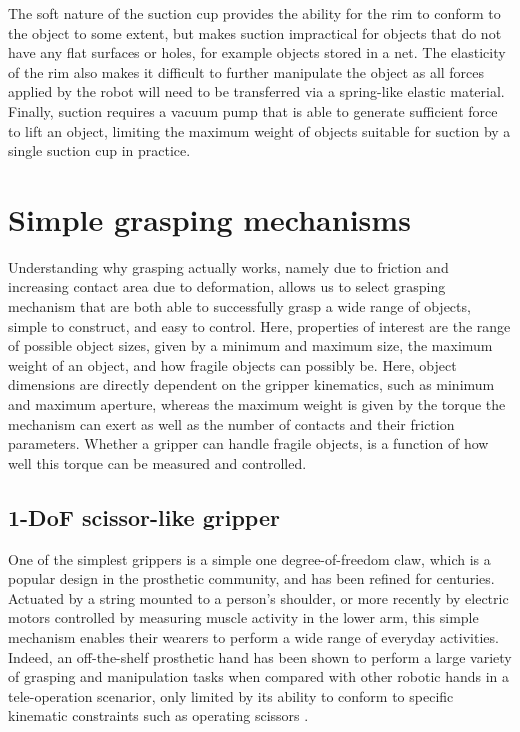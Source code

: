 The soft nature of the suction cup provides the ability for the rim to conform to the object to some extent, but makes suction impractical for objects that do not have any flat surfaces or holes, for example objects stored in a net. The elasticity of the rim also makes it difficult to further manipulate the object as all forces applied by the robot will need to be transferred via a spring-like elastic material. Finally, suction requires a vacuum pump that is able to generate sufficient force to lift an object, limiting the maximum weight of objects suitable for suction by a single suction cup in practice. 


\section{Simple grasping mechanisms}
Understanding why grasping actually works, namely due to friction and increasing contact area due to deformation, allows us to select grasping mechanism that are both able to successfully grasp a wide range of objects, simple to construct, and easy to control. Here, properties of interest are the range of possible object sizes, given by a minimum and maximum size, the maximum weight of an object, and how fragile objects can possibly be. Here, object dimensions are directly dependent on the gripper kinematics, such as minimum and maximum aperture, whereas the maximum weight is given by the torque the mechanism can exert as well as the number of contacts and their friction parameters. Whether a gripper can handle fragile objects, is a function of how well this torque can be measured and controlled. 

\subsection{1-DoF scissor-like gripper}
One of the simplest grippers is a simple one degree-of-freedom claw, which is a popular design in the prosthetic community, and has been refined for centuries. Actuated by a string mounted to a person's shoulder, or more recently by electric motors controlled by measuring muscle activity in the lower arm, this simple mechanism enables their wearers to perform a wide range of everyday activities. Indeed, an off-the-shelf prosthetic hand has been shown to perform a large variety of grasping and manipulation tasks when compared with other robotic hands in a tele-operation scenarior, only limited by its ability to conform to specific kinematic constraints such as operating scissors \cite{patel2016manipulation}.

